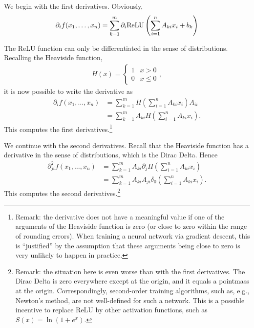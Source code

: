 \documentclass[11pt]{article}
\begin{document}
\begin{solution}
    We begin with the first derivatives. Obviously,
    \begin{align}
        \partial_{i} f(x_1,\dots,x_{n}) = \sum_{k=1}^{m} \partial_{i} {\mathrm{ReLU}}\left( \sum_{i=1}^{n} A_{ki} x_{i} + b_{k} \right)
    \end{align}
    
    The ReLU function can only be differentiated in the sense of distributions. Recalling the Heaviside function,
    \begin{align}
        H(x) = \begin{cases} 1 & x > 0 \\ 0 & x \leq 0 \end{cases},
    \end{align}
    it is now possible to write the derivative as 
    \begin{align}
        \partial_{i} f(x_1,\dots,x_{n}) 
        &= 
        \sum_{k=1}^{m} H\left( \sum_{i=1}^{n} A_{ki} x_{i} \right) A_{ii} 
        \\&
        =
        \sum_{k=1}^{m} A_{ki} H\left( \sum_{i=1}^{n} A_{ki} x_{i} \right)
        .
    \end{align}
    This computes the first derivatives.\footnote{Remark: the derivative does not have a meaningful value if one of the arguments of the Heaviside function is zero (or close to zero within the range of rounding errors). When training a neural network via gradient descent, this is ``justified'' by the assumption that these arguments being close to zero is very unlikely to happen in practice.}
    
    We continue with the second derivatives. Recall that the Heaviside function has a derivative in the sense of distributions, which is the Dirac Delta. Hence 
    \begin{align}
        \partial^{2}_{ji} f(x_1,\dots,x_{n}) 
        &
        = 
        \sum_{k=1}^{m} A_{ki} \partial_{j} H\left( \sum_{i=1}^{n} A_{ki} x_{i} \right)
        \\&
        = 
        \sum_{k=1}^{m} A_{ki} A_{ji} \delta_{0}\left( \sum_{i=1}^{n} A_{ki} x_{i} \right)
        .
    \end{align}
    This computes the second derivatives.\footnote{Remark: the situation here is even worse than with the first derivatives. The Dirac Delta is zero everywhere except at the origin, and it equals a pointmass at the origin. Correspondingly, second-order training algorithms, such as, e.g., Newton's method, are not well-defined for such a network. This is a possible incentive to replace ReLU by other activation functions, such as $S(x) = \ln( 1 + e^{x} )$.}
\end{solution}
\end{document}
